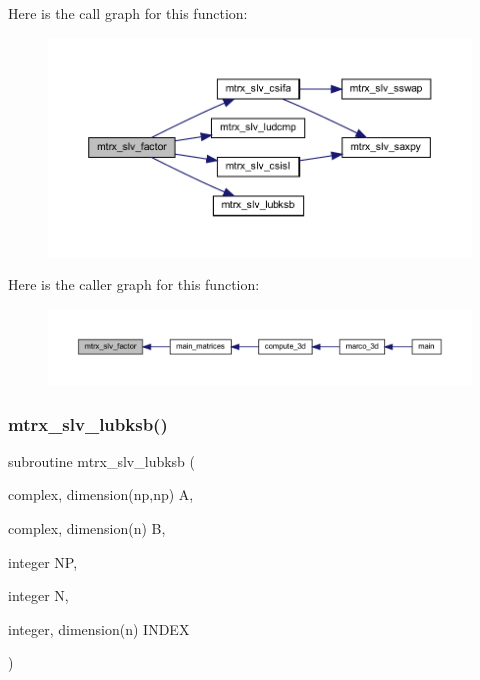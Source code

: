 Here is the call graph for this function\+:
\nopagebreak
\begin{figure}[H]
\begin{center}
\leavevmode
\includegraphics[width=350pt]{Marco_8f90_a09f928706f2018e58088d36d95fdfaba_cgraph}
\end{center}
\end{figure}
Here is the caller graph for this function\+:
\nopagebreak
\begin{figure}[H]
\begin{center}
\leavevmode
\includegraphics[width=350pt]{Marco_8f90_a09f928706f2018e58088d36d95fdfaba_icgraph}
\end{center}
\end{figure}
\mbox{\label{Marco_8f90_a12480a5c6798dd29e9fb9b68f16c280b}} 
\subsubsection{\texorpdfstring{mtrx\+\_\+slv\+\_\+lubksb()}{mtrx\_slv\_lubksb()}}
{\footnotesize\ttfamily subroutine mtrx\+\_\+slv\+\_\+lubksb (\begin{DoxyParamCaption}\item[{complex, dimension(np,np)}]{A,  }\item[{complex, dimension(n)}]{B,  }\item[{integer}]{NP,  }\item[{integer}]{N,  }\item[{integer, dimension(n)}]{I\+N\+D\+EX }\end{DoxyParamCaption})}

